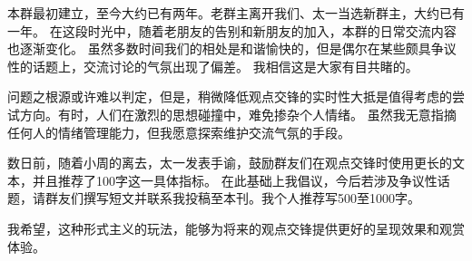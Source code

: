 

\renewcommand{\cachedcoverpagetextcolor}[0]{white}
\renewcommand{\coverbgshiftx}{27mm}












本群最初建立，至今大约已有两年。老群主离开我们、太一当选新群主，大约已有一年。%
在这段时光中，随着老朋友的告别和新朋友的加入，本群的日常交流内容也逐渐变化。%
虽然多数时间我们的相处是和谐愉快的，但是偶尔在某些颇具争议性的话题上，交流讨论的气氛出现了偏差。%
我相信这是大家有目共睹的。

问题之根源或许难以判定，但是，稍微降低观点交锋的实时性大抵是值得考虑的尝试方向。有时，人们在激烈的思想碰撞中，难免掺杂个人情绪。%
虽然我无意指摘任何人的情绪管理能力，但我愿意探索维护交流气氛的手段。

数日前，随着小周的离去，太一发表手谕，鼓励群友们在观点交锋时使用更长的文本，并且推荐了100字这一具体指标。%
在此基础上我倡议，今后若涉及争议性话题，请群友们撰写短文并联系我投稿至本刊。我个人推荐写500至1000字。

我希望，这种形式主义的玩法，能够为将来的观点交锋提供更好的呈现效果和观赏体验。








